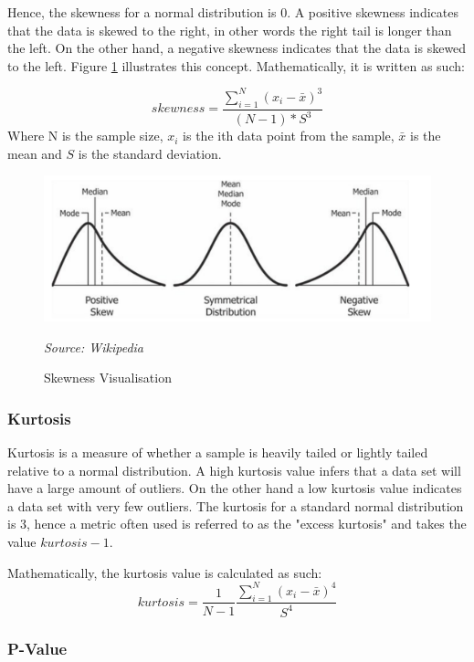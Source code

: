 Hence, the skewness for a normal distribution is 0. A positive skewness indicates that the data is skewed to the right, in other words the right tail is longer than the left. On the other hand, a negative skewness indicates that the data is skewed to the left. Figure \ref{skewness fig} illustrates this concept. Mathematically, it is written as such:

\begin{equation}
    skewness = \frac{\sum_{i=1}^{N}(x_{i} - \bar{x})^{3}}{(N - 1) * S^{3}}
\end{equation}
Where N is the sample size, $x_{i}$ is the ith data point from the sample, $\bar{x}$ is the mean and $S$ is the standard deviation.

\begin{figure}[h!]
      \centering
      \includegraphics[scale=0.8]{lit_review/skewness.png}
      \caption{Skewness Visualisation}
      \label{skewness fig}
      \emph{Source: Wikipedia}
\end{figure}

\subsubsection{Kurtosis}

Kurtosis is a measure of whether a sample is heavily tailed or lightly tailed relative to a normal distribution. A high kurtosis value infers that a data set will have a large amount of outliers. On the other hand a low kurtosis value indicates a data set with very few outliers. The kurtosis for a standard normal distribution is 3, hence a metric often used is referred to as the "excess kurtosis" and takes the value $kurtosis - 1$.

Mathematically, the kurtosis value is calculated as such:
\begin{equation}
    kurtosis = \frac{1}{N - 1} \frac{\sum_{i=1}^{N}(x_{i} - \bar{x})^{4}}{S^{4}}
\end{equation}

\subsubsection{P-Value}

